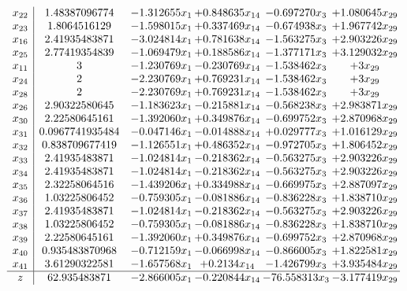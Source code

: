 \documentclass[11pt]{article}
\begin{document}
\[\begin{array}{c| c c@{\hskip 2pt} c@{\hskip 2pt} c@{\hskip 2pt} c@{\hskip 2pt} }
 x_{22}   &  1.48387096774 & -1.312655 x_{1} & + 0.848635 x_{14} & -0.697270 x_{3} & + 1.080645 x_{29}\\
 x_{23}   &  1.8064516129 & -1.598015 x_{1} & + 0.337469 x_{14} & -0.674938 x_{3} & + 1.967742 x_{29}\\
 x_{16}   &  2.41935483871 & -3.024814 x_{1} & + 0.781638 x_{14} & -1.563275 x_{3} & + 2.903226 x_{29}\\
 x_{25}   &  2.77419354839 & -1.069479 x_{1} & + 0.188586 x_{14} & -1.377171 x_{3} & + 3.129032 x_{29}\\
 x_{11}   &  3 & -1.230769 x_{1} & -0.230769 x_{14} & -1.538462 x_{3} & + 3 x_{29}\\
 x_{24}   &  2 & -2.230769 x_{1} & + 0.769231 x_{14} & -1.538462 x_{3} & + 3 x_{29}\\
 x_{28}   &  2 & -2.230769 x_{1} & + 0.769231 x_{14} & -1.538462 x_{3} & + 3 x_{29}\\
 x_{26}   &  2.90322580645 & -1.183623 x_{1} & -0.215881 x_{14} & -0.568238 x_{3} & + 2.983871 x_{29}\\
 x_{30}   &  2.22580645161 & -1.392060 x_{1} & + 0.349876 x_{14} & -0.699752 x_{3} & + 2.870968 x_{29}\\
 x_{31}   &  0.0967741935484 & -0.047146 x_{1} & -0.014888 x_{14} & + 0.029777 x_{3} & + 1.016129 x_{29}\\
 x_{32}   &  0.838709677419 & -1.126551 x_{1} & + 0.486352 x_{14} & -0.972705 x_{3} & + 1.806452 x_{29}\\
 x_{33}   &  2.41935483871 & -1.024814 x_{1} & -0.218362 x_{14} & -0.563275 x_{3} & + 2.903226 x_{29}\\
 x_{34}   &  2.41935483871 & -1.024814 x_{1} & -0.218362 x_{14} & -0.563275 x_{3} & + 2.903226 x_{29}\\
 x_{35}   &  2.32258064516 & -1.439206 x_{1} & + 0.334988 x_{14} & -0.669975 x_{3} & + 2.887097 x_{29}\\
 x_{36}   &  1.03225806452 & -0.759305 x_{1} & -0.081886 x_{14} & -0.836228 x_{3} & + 1.838710 x_{29}\\
 x_{37}   &  2.41935483871 & -1.024814 x_{1} & -0.218362 x_{14} & -0.563275 x_{3} & + 2.903226 x_{29}\\
 x_{38}   &  1.03225806452 & -0.759305 x_{1} & -0.081886 x_{14} & -0.836228 x_{3} & + 1.838710 x_{29}\\
 x_{39}   &  2.22580645161 & -1.392060 x_{1} & + 0.349876 x_{14} & -0.699752 x_{3} & + 2.870968 x_{29}\\
 x_{40}   &  0.935483870968 & -0.712159 x_{1} & -0.066998 x_{14} & -0.866005 x_{3} & + 1.822581 x_{29}\\
 x_{41}   &  3.61290322581 & -1.657568 x_{1} & + 0.2134 x_{14} & -1.426799 x_{3} & + 3.935484 x_{29}\\
\hline
z    &  62.935483871 & -2.866005 x_{1} & -0.220844 x_{14} & -76.558313 x_{3} & -3.177419 x_{29}\\
\end{array}\]
\end{document}
